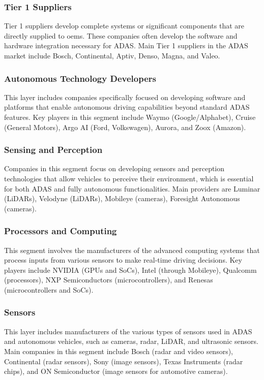 \subsubsection*{Tier 1 Suppliers}
Tier 1 suppliers develop complete systems or significant components that are 
directly supplied to \acp{oem}. These companies often develop the software and 
hardware integration necessary for ADAS.
Main Tier 1 suppliers in the ADAS market include Bosch, Continental, Aptiv, 
Denso, Magna, and Valeo.

\subsubsection*{Autonomous Technology Developers}
This layer includes companies specifically focused on developing software and 
platforms that enable autonomous driving capabilities beyond standard ADAS features.
Key players in this segment include Waymo (Google/Alphabet), Cruise (General Motors),
Argo AI (Ford, Volkswagen), Aurora, and Zoox (Amazon).

\subsubsection*{Sensing and Perception}
Companies in this segment focus on developing sensors and perception technologies 
that allow vehicles to perceive their environment, which is essential for both 
ADAS and fully autonomous functionalities.
Main providers are Luminar (LiDARs), Velodyne (LiDARs), Mobileye (cameras), 
Foresight Autonomous (cameras).

\subsubsection*{Processors and Computing}
This segment involves the manufacturers of the advanced computing systems that 
process inputs from various sensors to make real-time driving decisions.
Key players include NVIDIA (GPUs and SoCs), Intel (through Mobileye), 
Qualcomm (processors), NXP Semiconductors (microcontrollers), and 
Renesas (microcontrollers and SoCs).

\subsubsection*{Sensors}
This layer includes manufacturers of the various types of sensors used in ADAS 
and autonomous vehicles, such as cameras, radar, LiDAR, and ultrasonic sensors.
Main companies in this segment include Bosch (radar and video sensors),
Continental (radar sensors), Sony (image sensors), Texas Instruments (radar chips),
and ON Semiconductor (image sensors for automotive cameras).


